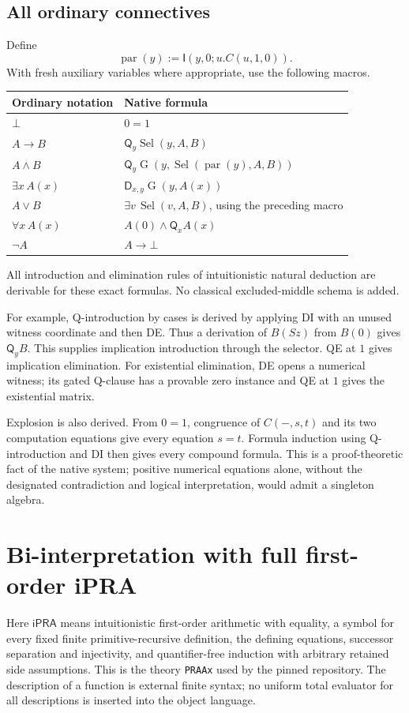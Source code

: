 \documentclass[11pt,letterpaper]{article}
\theoremstyle{definition}\newtheorem{definition}[theorem]{Definition}
\theoremstyle{remark}\newtheorem{remark}[theorem]{Remark}
\newcommand{\ipra}{\mathsf{iPRA}}
\newcommand{\Q}{\mathsf Q}
\newcommand{\D}{\mathsf D}
\newcommand{\I}{\mathsf I}
\newcommand{\Sel}{\operatorname{Sel}}
\newcommand{\Gate}{\operatorname{G}}
\newcommand{\parity}{\operatorname{par}}
\newcommand{\code}[1]{\texttt{#1}}
\begin{document}
\subsection{All ordinary connectives}
Define
\[
 \parity(y):=\I(y,0;u.C(u,1,0)).
\]
With fresh auxiliary variables where appropriate, use the following macros.
\begin{center}
\begin{tabular}{@{}ll@{}}
\toprule
Ordinary notation & Native formula\\
\midrule
\(\bot\) & \(0=1\)\\
\(A\to B\) & \(\Q_y\Sel(y,A,B)\)\\
\(A\wedge B\) & \(\Q_y\Gate(y,\Sel(\parity(y),A,B))\)\\
\(\exists x\,A(x)\) & \(\D_{x,y}\Gate(y,A(x))\)\\
\(A\vee B\) & \(\exists v\,\Sel(v,A,B)\), using the preceding macro\\
\(\forall x\,A(x)\) & \(A(0)\wedge\Q_xA(x)\)\\
\(\neg A\) & \(A\to\bot\)\\
\bottomrule
\end{tabular}
\end{center}
All introduction and elimination rules of intuitionistic natural deduction
are derivable for these exact formulas. No classical excluded-middle
schema is added.

For example, Q-introduction by cases is derived by applying DI with an
unused witness coordinate and then DE. Thus a derivation of \(B(Sz)\)
from \(B(0)\) gives \(\Q_yB\). This supplies implication introduction
through the selector. QE at \(1\) gives implication elimination. For
existential elimination, DE opens a numerical witness; its gated Q-clause
has a provable zero instance and QE at \(1\) gives the existential matrix.

Explosion is also derived. From \(0=1\), congruence of
\(C(-,s,t)\) and its two computation equations give every equation
\(s=t\). Formula induction using Q-introduction and DI then gives every
compound formula. This is a proof-theoretic fact of the native system;
positive numerical equations alone, without the designated contradiction
and logical interpretation, would admit a singleton algebra.

\section{Bi-interpretation with full first-order iPRA}
\label{sec:bi}
Here \(\ipra\) means intuitionistic first-order arithmetic with equality,
a symbol for every fixed finite primitive-recursive definition, the defining
equations, successor separation and injectivity, and quantifier-free
induction with arbitrary retained side assumptions. This is the theory
\code{PRAAx} used by the pinned repository. The description of a function
is external finite syntax; no uniform total evaluator for all descriptions
is inserted into the object language.\cite{nativebi,ordinarybi}
\end{document}
